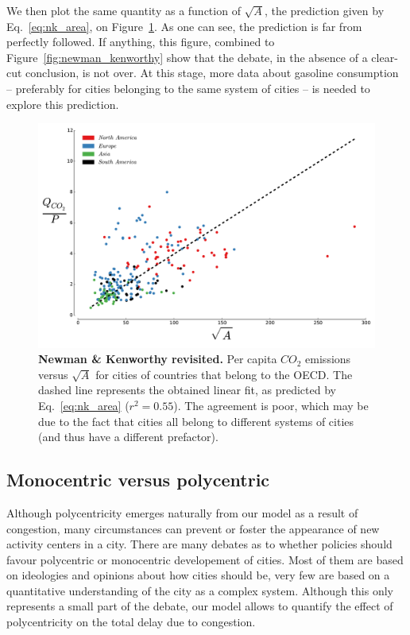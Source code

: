 We then plot the same quantity as a function of $\sqrt{A}$, the prediction given
by Eq.~\ref{eq:nk_area}, on Figure~\ref{fig:nk_model}. As one can see, the
prediction is far from perfectly followed. If anything, this figure, combined to
Figure~\ref{fig:newman_kenworthy} show that the debate, in the absence of a
clear-cut conclusion, is not over. At this stage, more data about gasoline
consumption -- preferably for cities belonging to the same system of cities --
is needed to explore this prediction.

\begin{figure}
    \centering
    \includegraphics[width=\textwidth]{gfx/chapter-scaling/nk_model.pdf}
    \caption{{\bf Newman \& Kenworthy revisited.} Per capita $CO_2$ emissions versus $\sqrt{A}$ for cities of
    countries that belong to the OECD. The dashed line represents the obtained
linear fit, as predicted by Eq.~\ref{eq:nk_area} ($r^2=0.55$). The agreement is
poor, which may be due to the fact that cities all belong to different systems
of cities (and thus have a different prefactor).\label{fig:nk_model}}
\end{figure}

\subsection{Monocentric versus polycentric}

Although polycentricity emerges naturally from our model as a result of
congestion, many circumstances can prevent or foster the appearance of new
activity centers in a city. There are many debates as to whether policies should
favour polycentric or monocentric developement of cities. Most of them are
based on ideologies and opinions about how cities should be, very few are based
on a quantitative understanding of the city as a complex system. Although this
only represents a small part of the debate, our model allows to quantify the
effect of polycentricity on the total delay due to congestion.

